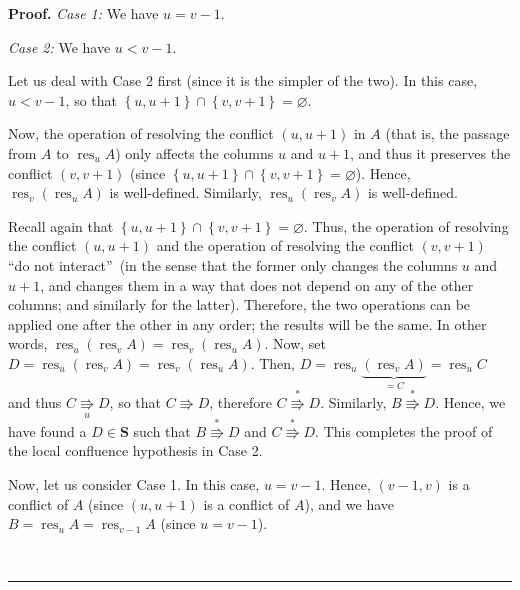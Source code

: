 \documentclass[numbers=enddot,12pt,final,onecolumn,notitlepage]{scrartcl}%
\theoremstyle{definition}
\newenvironment{proof}[1][Proof]{\noindent\textbf{#1.} }{\ \rule{0.5em}{0.5em}}
\newenvironment{vershort}{}{}
\begin{document}
\begin{vershort}
\begin{proof}
\textit{Case 1:} We have $u=v-1$.

\textit{Case 2:} We have $u<v-1$.

Let us deal with Case 2 first (since it is the simpler of the two). In this
case, $u<v-1$, so that $\left\{  u,u+1\right\}  \cap\left\{  v,v+1\right\}
=\varnothing$.

Now, the operation of resolving the conflict $\left(  u,u+1\right)  $ in $A$
(that is, the passage from $A$ to $\operatorname*{res}\nolimits_{u}A$) only
affects the columns $u$ and $u+1$, and thus it preserves the conflict $\left(
v,v+1\right)  $ (since $\left\{  u,u+1\right\}  \cap\left\{  v,v+1\right\}
=\varnothing$). Hence, $\operatorname*{res}\nolimits_{v}\left(
\operatorname*{res}\nolimits_{u}A\right)  $ is well-defined. Similarly,
$\operatorname*{res}\nolimits_{u}\left(  \operatorname*{res}\nolimits_{v}%
A\right)  $ is well-defined.

Recall again that $\left\{  u,u+1\right\}  \cap\left\{  v,v+1\right\}
=\varnothing$. Thus, the operation of resolving the conflict $\left(
u,u+1\right)  $ and the operation of resolving the conflict $\left(
v,v+1\right)  $ \textquotedblleft do not interact\textquotedblright\ (in the
sense that the former only changes the columns $u$ and $u+1$, and changes them
in a way that does not depend on any of the other columns; and similarly for
the latter). Therefore, the two operations can be applied one after the other
in any order; the results will be the same. In other words,
$\operatorname*{res}\nolimits_{u}\left(  \operatorname*{res}\nolimits_{v}%
A\right)  =\operatorname*{res}\nolimits_{v}\left(  \operatorname*{res}%
\nolimits_{u}A\right)  $. Now, set $D=\operatorname*{res}\nolimits_{u}\left(
\operatorname*{res}\nolimits_{v}A\right)  =\operatorname*{res}\nolimits_{v}%
\left(  \operatorname*{res}\nolimits_{u}A\right)  $. Then,
$D=\operatorname*{res}\nolimits_{u}\underbrace{\left(  \operatorname*{res}%
\nolimits_{v}A\right)  }_{=C}=\operatorname*{res}\nolimits_{u}C$ and thus
$C\underset{u}{\Rrightarrow}D$, so that $C\Rrightarrow D$, therefore
$C\overset{\ast}{\Rrightarrow}D$. Similarly, $B\overset{\ast}{\Rrightarrow}D$.
Hence, we have found a $D\in\mathbf{S}$ such that $B\overset{\ast
}{\Rrightarrow}D$ and $C\overset{\ast}{\Rrightarrow}D$. This completes the
proof of the local confluence hypothesis in Case 2.

Now, let us consider Case 1. In this case, $u=v-1$. Hence, $\left(
v-1,v\right)  $ is a conflict of $A$ (since $\left(  u,u+1\right)  $ is a
conflict of $A$), and we have $B=\operatorname*{res}\nolimits_{u}%
A=\operatorname*{res}\nolimits_{v-1}A$ (since $u=v-1$).


\end{proof}
\end{vershort}
\end{document}
